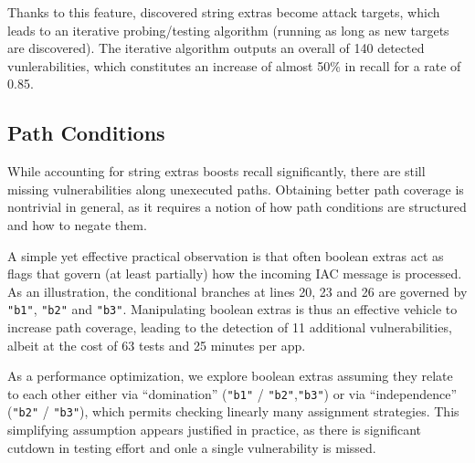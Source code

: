 Thanks to this feature, discovered string extras become attack targets, which leads to an iterative probing/testing algorithm (running as long as new targets are discovered). The iterative algorithm outputs an overall of 140 detected vunlerabilities, which constitutes an increase of almost 50\% in recall for a rate of 0.85.

\subsection{Path Conditions}

While accounting for string extras boosts recall significantly, there are still missing vulnerabilities along unexecuted paths. Obtaining better path coverage is nontrivial in general, as it requires a notion of how path conditions are structured and how to negate them.

A simple yet effective practical observation is that often boolean extras act as flags that govern (at least partially) how the incoming IAC message is processed. As an illustration,
the conditional branches at lines 20, 23 and 26 are governed by {\tt "b1"}, {\tt "b2"} and {\tt "b3"}. Manipulating boolean extras is thus an effective vehicle to increase path coverage, leading to the detection of 11 additional vulnerabilities, albeit at the cost of 63 tests and 25 minutes per app.

As a performance optimization, we explore boolean extras assuming they relate to each other either via ``domination'' ({\tt "b1"} / {\tt "b2"},{\tt "b3"}) or via ``independence''
({\tt "b2"} / {\tt "b3"}), which permits checking linearly many assignment strategies. This simplifying assumption appears justified in practice, as there is significant cutdown in testing effort and onle a single vulnerability is missed.